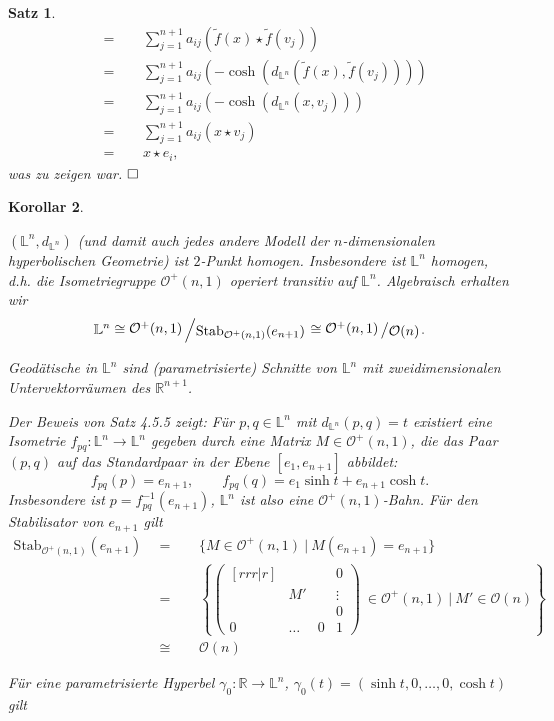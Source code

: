 \documentclass[11pt]{book}
\numberwithin{dummy}{section}
\newtheorem{theorem}{Satz}[section]
\newtheorem{corollary}[theorem]{Korollar}
\theoremstyle{nonumberbreak}
\newenvironment{pr}[1][]{\ifthenelse{\equal{#1}{}}{\proof}{\proof[#1]}\rm}{\endproof}
\newcommand{\Loid}{\mathbb{L}}
\newcommand{\R}{\mathbb{R}}
\newcommand{\la}{\longrightarrow}
\newcommand{\slant}[2]{{\raisebox{.1em}{$#1$}\left/\raisebox{-.1em}{$#2$}\right.}}
\begin{document}
\begin{spacing}{1.4}
\begin{theorem}
\begin{pr}
\begin{alignat*}{5}
&=&& \ \ \sum_{j=1}^{n+1} a_{ij} \left( \tilde{f}(x) \star \tilde{f}(v_j)\right) \\
&=&& \ \ \sum_{j=1}^{n+1} a_{ij} \left( - \cosh \left( d_{\Loid^n}(\tilde{f}(x), \tilde{f}(v_j))\right) \right) \\
&=&& \ \ \sum_{j=1}^{n+1} a_{ij} \left( - \cosh \left( d_{\Loid^n}(x,v_j)\right) \right) \\
&=&& \ \ \sum_{j=1}^{n+1} a_{ij} \left( x \star v_j\right) \\
&=&& \ \ x \star e_i,
\end{alignat*}
was zu zeigen war. $\hfill \Box$
\end{pr}

\end{theorem}



\begin{corollary}
\begin{compactenum}
\item $(\Loid^n, d_{\Loid^n})$ (und damit auch jedes andere Modell der $n$-dimensionalen hyperbolischen Geometrie) ist $2$-Punkt homogen. Insbesondere ist $\Loid^n$ homogen, d.h. die Isometriegruppe $\mathcal{O}^+(n,1)$ operiert transitiv auf $\Loid^n$. Algebraisch erhalten wir
$$\Loid^n \cong \slant{\mathcal{O}^+(n,1)}{\mathrm{Stab}_{\mathcal{O}^+(n,1)}(e_{n+1})} \cong \slant{\mathcal{O}^+(n,1)}{\mathcal{O}(n)}.$$
\item Geodätische in $\Loid^n$ sind (parametrisierte) Schnitte von $\Loid^n$ mit zweidimensionalen Untervektorräumen des $\R^{n+1}$. 
\end{compactenum}
\begin{pr}
\begin{compactenum}
\item Der Beweis von Satz 4.5.5 zeigt: Für $p,q \in \Loid^n$ mit $d_{\Loid^n}(p,q) = t$ existiert eine Isometrie $f_{pq}: \Loid^n \la \Loid^n$ gegeben durch eine Matrix $M \in \mathcal{O}^+(n,1)$, die das Paar $(p,q)$ auf das Standardpaar in der Ebene $[e_1, e_{n+1}]$ abbildet:
$$f_{pq}(p) = e_{n+1}, \qquad f_{pq}(q) = e_1 \sinh t + e_{n+1} \cosh t.$$
Insbesondere ist $p=f_{pq}^{-1}(e_{n+1})$, $\Loid^n$ ist also eine $\mathcal{O}^+(n,1)$-Bahn. Für den Stabilisator von $e_{n+1}$ gilt 
\begin{alignat*}{5}
\mathrm{Stab}_{\mathcal{O}^+(n,1)}(e_{n+1}) \ \ &=&& \ \ \{M \in \mathcal{O}^+(n,1) \ \vert \ M(e_{n+1}) = e_{n+1} \} \\
&=&& \ \ \left\{ \begin{pmatrix}[rrr|r] &&& 0 \\[-6pt] &M'&&\vdots \\[-6pt] &&& 0 \\[-3pt] \hline 0 & \ldots & 0 & 1 \end{pmatrix} \ \in \mathcal{O}^+(n,1) \ \bigg\vert \ M' \in \mathcal{O}(n) \right\} \\
&\cong&& \ \ \mathcal{O}(n)
\end{alignat*}
\item Für eine parametrisierte Hyperbel $\gamma_0: \R \la \Loid^n$, $\gamma_0(t) = (\sinh t,0, \ldots, 0, \cosh t)$ gilt


\end{compactenum}
\end{pr}
\end{corollary}
\end{spacing}
\end{document}
